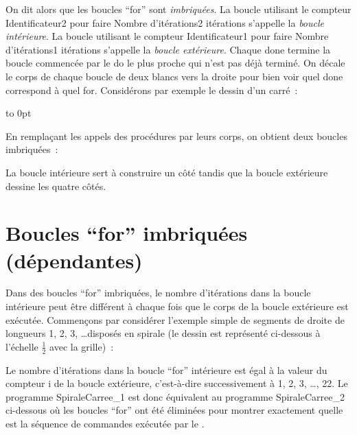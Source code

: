 \noindent On dit alors que les  boucles ``for'' sont {\em imbriquées}.
La boucle utilisant le
compteur {\small\rm Identificateur2} pour faire
{\small\rm Nombre d'itérations2} itérations s'appelle la
 {\em boucle intérieure}. La boucle utilisant le compteur {\small\rm Identificateur1} pour faire
{\small\rm Nombre d'itérations1} itérations s'appelle la {\em boucle extérieure}.
Chaque {\mcl done} termine la boucle commencée par le {\mcl do} le plus proche qui n'est pas
déjà terminé. On décale le corps de chaque boucle de deux blancs vers la droite pour bien
voir quel {\mcl done} correspond à quel {\mcl for}. Considérons par exemple
le dessin d'un carré~:
\par\noindent\begin{minipage}{\linewidth}
\vbox to 0pt{}%

\end{minipage}

En remplaçant les appels des procédures par leurs corps, on obtient
deux boucles imbriquées~:



La boucle intérieure sert à construire un côté tandis que la boucle
ex\-té\-rieu\-re dessine les quatre côtés.

\section{Boucles ``for'' imbriquées (dépendantes)}

Dans des boucles ``for'' imbriquées, le nombre d'itérations
dans la boucle in\-té\-rieu\-re peut être dif\-fé\-rent à chaque fois que le corps de
la boucle extérieure est exécutée. Commençons par considérer l'exemple
simple de segments de droite de longueurs 1, 2, 3, \ldots disposés en spirale
(le dessin est représenté ci-dessous à l'échelle $\frac{1}{2}$ avec la grille)~:\\[5cm]
%
\vspace*{-5cm}%


Le nombre d'itérations dans la boucle ``for'' intérieure est égal à la valeur
du compteur {\idt i} de la boucle extérieure, c'est-à-dire successivement à 1, 2,
3, \ldots, 22. Le programme {\idt SpiraleCarree\_1} est donc équivalent au
programme {\idt SpiraleCarree\_2} ci-dessous où les boucles ``for'' ont été
éliminées pour montrer exactement quelle est la séquence de commandes exécutée
par le \robot.

